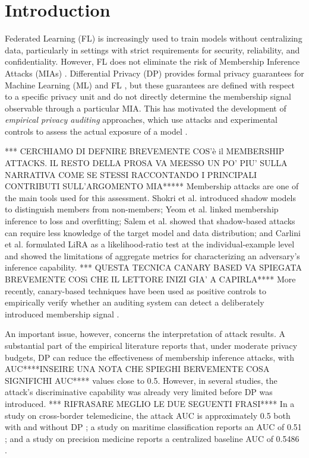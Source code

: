 
\section{Introduction}
\label{sec:introduction}

Federated Learning (FL) is increasingly used to train models without centralizing data, particularly in settings with strict requirements for security, reliability, and confidentiality. However, FL does not eliminate the risk of Membership Inference Attacks (MIAs) \cite{shokri2017membership,carlini2022membership,nasr2019comprehensive}. Differential Privacy (DP) provides formal privacy guarantees for Machine Learning (ML) and FL \cite{dwork2006calibrating,abadi2016deep,mcmahan2018learning,jayaraman2019evaluating}, but these guarantees are defined with respect to a specific privacy unit and do not directly determine the membership signal observable through a particular MIA. This has motivated the development of \textit{empirical privacy auditing} approaches, which use attacks and experimental controls to assess the actual exposure of a model \cite{jagielski2020auditing,steinke2023privacy}.

*** CERCHIAMO DI DEFNIRE BREVEMENTE COS'è il MEMBERSHIP ATTACKS. IL RESTO DELLA PROSA VA MEESSO UN PO' PIU' SULLA NARRATIVA COME SE STESSI RACCONTANDO I PRINCIPALI CONTRIBUTI SULL'ARGOMENTO MIA*****
Membership attacks are one of the main tools used for this assessment. Shokri et al. \cite{shokri2017membership} introduced shadow models to distinguish members from non-members; Yeom et al. \cite{yeom2018privacy} linked membership inference to loss and overfitting; Salem et al. \cite{salem2019mlleaks} showed that shadow-based attacks can require less knowledge of the target model and data distribution; and Carlini et al. \cite{carlini2022membership} formulated LiRA as a likelihood-ratio test at the individual-example level and showed the limitations of aggregate metrics for characterizing an adversary's inference capability. 
*** QUESTA TECNICA  CANARY BASED VA SPIEGATA BREVEMENTE COSì CHE IL LETTORE INIZI GIA' A CAPIRLA**** 
More recently, canary-based techniques have been used as positive controls to empirically verify whether an auditing system can detect a deliberately introduced membership signal \cite{maddock2023canife}.

An important issue, however, concerns the interpretation of attack results. A substantial part of the empirical literature reports that, under moderate privacy budgets, DP can reduce the effectiveness of membership inference attacks, with AUC****INSEIRE UNA NOTA CHE SPIEGHI BERVEMENTE COSA SIGNIFICHI AUC**** values close to 0.5. However, in several studies, the attack's discriminative capability was already very limited before DP was introduced. *** RIFRASARE MEGLIO LE DUE SEGUENTI FRASI**** In a study on cross-border telemedicine, the attack AUC is approximately 0.5 both with and without DP \cite{meyo2025}; a study on maritime classification reports an AUC of 0.51 \cite{Khan2026}; and a study on precision medicine reports a centralized baseline AUC of 0.5486 \cite{pasupuleti2025}.

